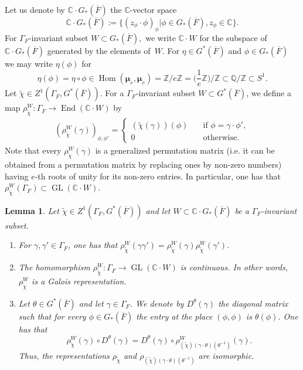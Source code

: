 \documentclass[a4paper,english,12pt]{amsart}
\newcommand{\QQ}{\mathbb{Q}}
\newcommand{\CC}{\mathbb{C}}
\newcommand{\oF}{\overline F}
\newcommand{\ZZ}{\mathbb{Z}}
\newcommand{\muu}{\boldsymbol{\mu}}
\DeclareMathOperator{\End}{End}
\DeclareMathOperator{\Hom}{Hom}
\DeclareMathOperator{\GL}{GL}
\DeclareMathOperator{\cont}{cont}
\newtheorem{lem}[equation]{Lemma}
\numberwithin{equation}{subsection}
\begin{document}
Let us denote by $\CC\cdot G_*(\overline F)$ the $\CC$-vector space $$ \CC\cdot G_*(\overline F):=\{(z_{\phi}\cdot \phi)_{\phi}|\phi\in G_*(\overline F), z_{\phi}\in \CC\}.$$ For $\Gamma_F$-invariant subset $W\subset G_*(\oF),$ we write $\CC\cdot W$ for the subspace of $\CC\cdot G_*(\oF)$ generated by the elements of~$W.$  %
For $\eta\in G^*(\oF)$ and $\phi\in G_*(\oF)$ we may write $\eta(\phi)$ for $$\eta(\phi)=\eta\circ\phi\in\Hom(\muu_e,\muu_e)=\ZZ/e\ZZ=\bigg(\frac{1}{e}\ZZ\bigg)/\ZZ\subset\QQ/\ZZ\subset S^1.$$ Let $\widetilde \chi\in Z^1(\Gamma_F, G^*(\overline F)).$ For a $\Gamma_F$-invariant subset $W\subset G^*(\oF)$, we define a map $\rho^W_{\widetilde\chi}: \Gamma_F\to\End(\CC\cdot W)$ by  
\begin{align*}
(\rho^W_{\widetilde\chi}(\gamma))_{\phi, \phi'}=\begin{cases} (\widetilde\chi(\gamma))(\phi)&\quad \text{if } \phi=\gamma\cdot\phi',\\
0&\quad\text{otherwise.}
\end{cases}
\end{align*}
Note that every $\rho^W_{\widetilde\chi}(\gamma)$ is a generalized permutation matrix (i.e. it can be obtained from a permutation matrix by replacing ones by non-zero numbers) having $e$-th roots of unity for its non-zero entries. In particular, one has that $\rho^W_{\widetilde\chi}(\Gamma_F)\subset \GL(\CC\cdot W)$. 
\begin{lem}\label{rhorep} Let $\widetilde\chi\in Z^1(\Gamma_F, G^*(\overline F))$ and let $W\subset \CC\cdot G_*(\oF)$ be a $\Gamma_F$-invariant subset.
\begin{enumerate}
\item  For $\gamma,\gamma'\in\Gamma_F$, one has that $\rho^W_{\widetilde\chi}(\gamma\gamma')=\rho^W_{\widetilde\chi}(\gamma)\rho^W_{\widetilde\chi}(\gamma')$.
\item The homomorphism $\rho^W_{\widetilde\chi}:\Gamma_F\to\GL(\CC\cdot W)$ is continuous. In other words, $\rho^W_{\widetilde\chi}$ is a Galois representation.
\item Let $\theta\in G^*(\oF)$ and let $\gamma\in\Gamma_F$. We denote by $D^{\theta}(\gamma)$ the diagonal matrix such that for every $\phi\in G_*(\oF)$ the entry at the place $(\phi,\phi)$ is $\theta(\phi)$. One has that $$\rho^W_{\widetilde\chi}(\gamma)\circ D^{\theta}(\gamma)=D^{\theta}(\gamma)\circ\rho^W_{(\widetilde\chi)(\gamma\cdot \theta)(\theta^{-1})}(\gamma).$$Thus, the representations $\rho_{\widetilde\chi}$ and $\rho_{(\widetilde\chi)(\gamma\cdot\theta)(\theta^{-1})}$ are isomorphic.
\end{enumerate}
\end{lem}
\end{document}
